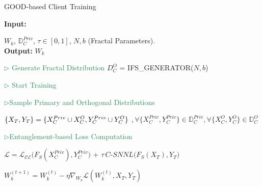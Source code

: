 \setcounter{algorithm}{0}
\begin{algorithm}[t]
\small
\caption{GOOD-based Client Training }
\label{Algo-1}
\textbf{Input:} \raggedright ${W}_k$,  $\mathbb{D}_C^{Priv}$, $\tau \in [0,1]$, ${N, b}$ (Fractal Parameters).\\
\textbf{Output:} ${W}_k$
\begin{algorithmic}[1]
\vspace{-0.1in}
\item[]
\Statex \hspace{-0.2in} \textcolor{SeaGreen}{\(\triangleright\) Generate Fractal Distribution}
\STATE ${D}_C^O$ = IFS\_GENERATOR(${N, b}$) 

\Statex \hspace{-0.2in} \textcolor{SeaGreen}{\(\triangleright\) Start Training}


\Statex \hspace{-0.2in} \textcolor{SeaGreen}{\(\triangleright\)Sample Primary and Orthogonal Distributions}

\STATE $\{X_T, Y_T\} = \{X_C^{Priv} \cup 
\vspace{0.05in}
X_C^O,Y_C^{Priv} \cup Y_C^O\}$ \newline
$,\forall \{X_C^{Priv},Y_C^{Priv}\}  \in \mathbb{D}_C^{Priv}, \forall \{X_C^O,Y_C^O\}  \in \mathbb{D}_C^O$

\Statex \hspace{-0.2in} \textcolor{SeaGreen}{\(\triangleright\)Entanglement-based Loss Computation}

\STATE $\mathcal{L} = \mathcal{L_{CE}}\big({F}_S(X_C^{Priv}),Y_C^{Priv} \big)$ + $\tau \, C$-$SNNL\big({F}_S(X_T),Y_T \big)$

\STATE $W_k^{(t+1)} = W_k^{(t)} - \eta \nabla_{W_k} \mathcal{L}(W_k^{(t)}, X_T, Y_T)
$

\ENDFOR
{} 
\end{algorithmic}
\end{algorithm}

